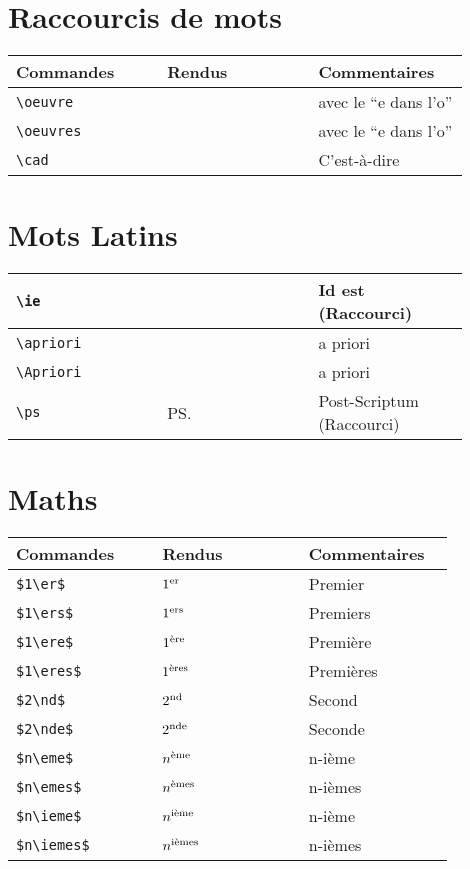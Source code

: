\documentclass[a4paper,12pt]{article}
\newcommand{\rac}{({\color{red}Raccourci})}
\begin{document}
	
	\section{Raccourcis de mots}

		\noindent
		\begin{tabular}{|p{0.3\linewidth}|p{0.3\linewidth}|p{0.3\linewidth}|}
			\hline
				\textbf{Commandes}&\textbf{Rendus}&\textbf{Commentaires}
			\\\hline\hline
				\verb!\oeuvre!	&	\oeuvre 	&	avec le ``e dans l'o''
			\\\hline
				\verb!\oeuvres!	&	\oeuvres	&	avec le ``e dans l'o''
			\\\hline
				\verb!\cad!	&	\cad		&  C'est-à-dire
			\\\hline
		\end{tabular}

	\section{Mots Latins}
	
		\noindent
		\begin{tabular}{|p{0.3\linewidth}|p{0.3\linewidth}|p{0.3\linewidth}|}
			\hline
				\verb!\ie!	&	\ie		&  Id est \rac
			\\\hline
				\verb!\apriori!	&	\apriori	&  a priori
			\\\hline
				\verb!\Apriori!	&	\Apriori	&  a priori
			\\\hline
				\verb!\ps!	&	\ps		&  Post-Scriptum \rac
			\\\hline
		\end{tabular}


	\section{Maths}

		\begin{tabular}{|p{0.3\linewidth}|p{0.3\linewidth}|p{0.3\linewidth}|}
			\hline
				\textbf{Commandes}&\textbf{Rendus}&\textbf{Commentaires}
			\\\hline\hline
				\verb!$1\er$!	&	$1\er$	 	&	Premier
			\\\hline
				\verb!$1\ers$!	&	$1\ers$	 	&	Premiers
			\\\hline
				\verb!$1\ere$!	&	$1\ere$		&	Première
			\\\hline
				\verb!$1\eres$!	&	$1\eres$	&	Premières
			\\\hline
				\verb!$2\nd$!	&	$2\nd$		&	Second
			\\\hline
				\verb!$2\nde$!	&	$2\nde$		&	Seconde
			\\\hline
				\verb!$n\eme$!	&	$n\eme$		&	n-ième
			\\\hline
				\verb!$n\emes$!	&	$n\emes$	&	n-ièmes
			\\\hline
				\verb!$n\ieme$!	&	$n\ieme$		&	n-ième
			\\\hline
				\verb!$n\iemes$!&	$n\iemes$	&	n-ièmes
			\\\hline
		\end{tabular}
	
\end{document}

